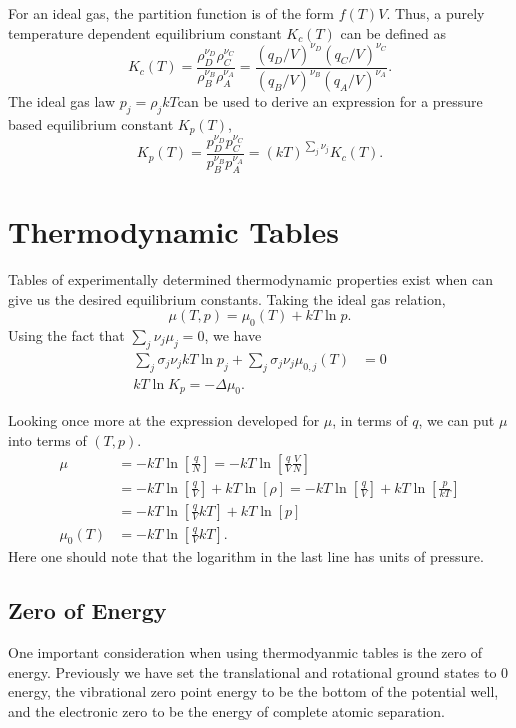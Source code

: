 For an ideal gas, the partition function is of the form $f(T) V$. Thus, a purely
temperature dependent equilibrium constant $K_c (T)$ can be defined as
\begin{equation*}
	K_c (T) = \frac{\rho_{D}^{\nu_D}\rho_{C}^{\nu_C}}
	{\rho_{B}^{\nu_B}\rho_{A}^{\nu_A}} =
	\frac{{(q_{D}/V)}^{\nu_D}{(q_{C}/V)}^{\nu_C}}
	{{(q_{B}/V)}^{\nu_B}{(q_{A}/V)}^{\nu_A}}.
\end{equation*}
The ideal gas law $p_j = \rho_j kT$can be used to derive an expression for a pressure based
equilibrium constant $K_p (T)$,
\begin{equation*}
	K_p(T) = \frac{p_{D}^{\nu_D}p_{C}^{\nu_C}}{p_{B}^{\nu_B}p_{A}^{\nu_A}} =
	(kT)^{\sum_{j}{\nu_{j}}} K_c (T).
\end{equation*}

\section{Thermodynamic Tables}%
\label{sec:chemeqtt}
Tables of experimentally determined thermodynamic properties exist when can give
us the desired equilibrium constants. Taking the ideal gas relation,
\begin{equation*}
	\mu(T,p) = \mu_0 (T) + kT\ln{p}.
\end{equation*}
Using the fact that $\sum_{j}{\nu_j \mu_j} = 0$, we have
\begin{align*}
	\sum_{j}{\sigma_j \nu_j kT\ln{p_{j}}} + \sum_{j}{\sigma_j \nu_j
	\mu_{0,j}(T)} &= 0\\
	kT\ln{K_{p}} = - {\Delta \mu_{0}}.
\end{align*}

Looking once more at the expression developed for $\mu$, in terms of $q$, we can
put $\mu$ into terms of $(T, p)$.
\begin{align*}
	\mu &= -kT\ln{\left[\frac{q}{N}\right]} = 
	-kT\ln{\left[\frac{q}{V} \frac{V}{N}\right]}\\
		&= -kT\ln{\left[\frac{q}{V} \right]} + kT\ln{[\rho]} =
		-kT\ln{\left[\frac{q}{V} \right]} + kT\ln{\left[ \frac{p}{kT} \right]} \\
		&= -kT\ln{\left[\frac{q}{V} kT \right]} + kT\ln{[p]} \\
	\mu_0 (T) &= -kT\ln{\left[\frac{q}{V} kT \right]}.
\end{align*}
Here one should note that the logarithm in the last line has units of pressure.
\subsection{Zero of Energy}
One important consideration when using thermodyanmic tables is the zero of
energy. Previously we have set the translational and rotational ground states to
0 energy, the vibrational zero point energy to be the bottom of the potential
well, and the electronic zero to be the energy of complete atomic separation.

